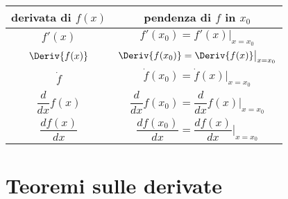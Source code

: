 % 

\begin{center}
\begin{tabular}{cc}
derivata di \(f(x)\) & pendenza di \(f\) in \(x_0\) \\
\midrule
\(f'(x)\) &  \(f'(x_0) = f'(x) \big |_{x = x_0}\)\\[.4em]
\(\Deriv{f(x)}\) & \(\Deriv{f(x_0)} = 
\Deriv{f(x)} \big |_{x = x_0}\)\\[.4em]
\(\dot{f}\) & \(\dot{f}(x_0) = 
\dot{f}(x) \big |_{x = x_0}\)\\[.4em]
\(\dfrac{d}{dx}f(x)\) & \(\dfrac{d}{dx}f(x_0) = 
\dfrac{d}{dx}f(x) \bigg |_{x = x_0}\) \\[1.1em]
\(\dfrac{df(x)}{dx}\) & \(\dfrac{df(x_0)}{dx} = 
\dfrac{df(x)}{dx} \bigg |_{x = x_0}\) 
\\[.5em]
\bottomrule
\end{tabular}
\end{center}

\pagebreak %

\section{Teoremi sulle derivate}
\label{sec:differenziazione_teoremi}

